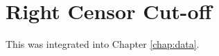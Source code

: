 
\chapter{Right Censor Cut-off} \label{app-right-censor}

This was integrated into Chapter \ref{chap:data}.